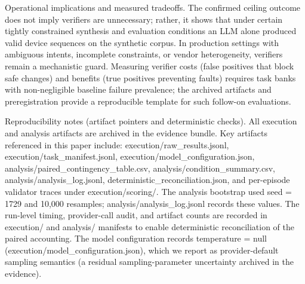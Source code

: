 \documentclass[conference]{IEEEtran}
\begin{document}
Operational implications and measured tradeoffs. The confirmed ceiling outcome does not imply verifiers are unnecessary; rather, it shows that under certain tightly constrained synthesis and evaluation conditions an LLM alone produced valid device sequences on the synthetic corpus. In production settings with ambiguous intents, incomplete constraints, or vendor heterogeneity, verifiers remain a mechanistic guard. Measuring verifier costs (false positives that block safe changes) and benefits (true positives preventing faults) requires task banks with non-negligible baseline failure prevalence; the archived artifacts and preregistration provide a reproducible template for such follow-on evaluations.

Reproducibility notes (artifact pointers and deterministic checks). All execution and analysis artifacts are archived in the evidence bundle. Key artifacts referenced in this paper include: execution/raw\_results.jsonl, execution/task\_manifest.jsonl, execution/model\_configuration.json, analysis/paired\_contingency\_table.csv, analysis/condition\_summary.csv, analysis/analysis\_log.jsonl, deterministic\_reconciliation.json, and per-episode validator traces under execution/scoring/. The analysis bootstrap used seed = 1729 and 10,000 resamples; analysis/analysis\_log.jsonl records these values. The run-level timing, provider-call audit, and artifact counts are recorded in execution/ and analysis/ manifests to enable deterministic reconciliation of the paired accounting. The model configuration records temperature = null (execution/model\_configuration.json), which we report as provider-default sampling semantics (a residual sampling-parameter uncertainty archived in the evidence).
\end{document}
